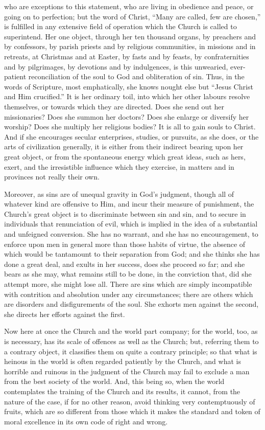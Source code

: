 who are exceptions to this statement, who are living in obedience and
peace, or going on to perfection; but the word of Christ, ``Many
are called, few are chosen,'' is fulfilled in any extensive field
of operation which the Church is called to superintend. Her one
object, through her ten thousand organs, by preachers and by
confessors, by parish priests and by religious communities, in
missions and in retreats, at Christmas and at Easter, by fasts and by
feasts, by confraternities and by pilgrimages, by devotions and by
indulgences, is this unwearied, ever-patient reconciliation of the
soul to God and obliteration of sin. Thus, in the words of Scripture,
most emphatically, she knows nought else but ``Jesus Christ and
Him crucified.'' It is her ordinary toil, into which her other
labours resolve themselves, or towards which they are directed. Does
she send out her missionaries? Does she summon her doctors? Does she
enlarge or diversify her worship? Does she multiply her religious
bodies? It is all to gain souls to Christ. And if she encourages
secular enterprises, studies, or pursuits, as she does, or the arts of
civilization generally, it is either from their indirect bearing upon
her great object, or from the spontaneous energy which great ideas,
such as hers, exert, and the irresistible influence which they
exercise, in matters and in provinces not really their own.

Moreover, as sins are of unequal gravity in God's judgment, though
all of whatever kind are offensive to Him, and incur their measure of
punishment, the Church's great object is to discriminate between sin
and sin, and to secure in individuals that renunciation of evil, which
is implied in the idea of a substantial and unfeigned conversion. She
has no warrant, and she has no encouragement, to enforce upon men in
general more than those habits of virtue, the absence of which would
be tantamount to their separation from God; and she thinks she has
done a great deal, and exults in her success, does she proceed so far;
and she bears as she may, what remains still to be done, in the
conviction that, did she attempt more, she might lose all. There are
sins which are simply incompatible with contrition and absolution
under any circumstances; there are others which are disorders and
disfigurements of the soul. She exhorts men against the second, she
directs her efforts against the first.

Now here at once the Church and the world part company; for the
world, too, as is necessary, has its scale of offences as well as the
Church; but, referring them to a contrary object, it classifies them
on quite a contrary principle; so that what is heinous in the world is
often regarded patiently by the Church, and what is horrible and
ruinous in the judgment of the Church may fail to exclude a man from
the best society of the world. And, this being so, when the world
contemplates the training of the Church and its results, it cannot,
from the nature of the case, if for no other reason, avoid thinking
very contemptuously of fruits, which are so different from those which
it makes the standard and token of moral excellence in its own code of
right and wrong.

